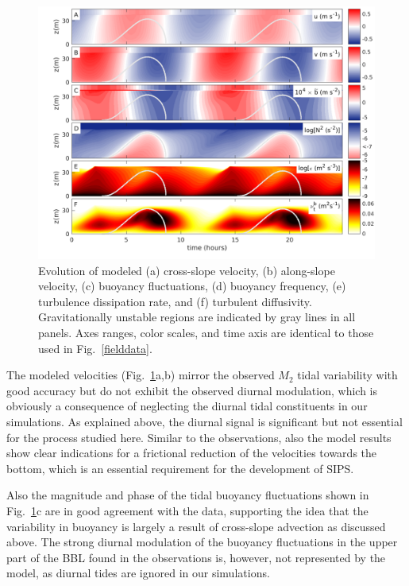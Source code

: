 \begin{figure}
  \noindent\includegraphics[width=40pc]{modeloutcome.png}
  \caption{Evolution of modeled (a) cross-slope velocity, (b)
    along-slope velocity, (c) buoyancy fluctuations, (d) buoyancy
    frequency, (e) turbulence dissipation rate, and (f) turbulent
    diffusivity. Gravitationally unstable regions are indicated by
    gray lines in all panels. Axes ranges, color scales, and time axis
    are identical to those used in Fig.\ \ref{fielddata}. }
  \label{modeloutcome}
\end{figure}

The modeled velocities (Fig.\ \ref{modeloutcome}a,b) mirror the
observed $M_2$ tidal variability with good accuracy but do not exhibit
the observed diurnal modulation, which is obviously a consequence of
neglecting the diurnal tidal constituents in our simulations. As
explained above, the diurnal signal is significant but not essential
for the process studied here.  Similar to the observations, also the
model results show clear indications for a frictional reduction of the
velocities towards the bottom, which is an essential requirement for
the development of SIPS.

Also the magnitude and phase of the tidal buoyancy fluctuations shown
in Fig.\ \ref{modeloutcome}c are in good agreement with the data,
supporting the idea that the variability in buoyancy is largely a
result of cross-slope advection as discussed above. The strong diurnal
modulation of the buoyancy fluctuations in the upper part of the BBL
found in the observations is, however, not represented by the
model, as diurnal tides are ignored in our simulations.

